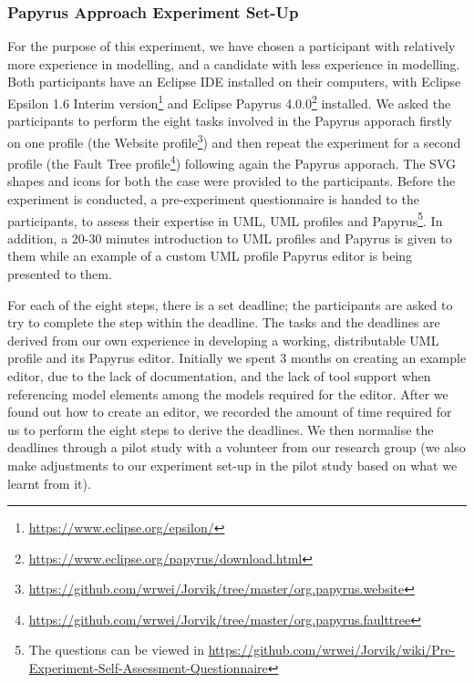 \subsubsection{Papyrus Approach Experiment Set-Up}
For the purpose of this experiment, we have chosen a participant with relatively more experience in modelling, and a candidate with less experience in modelling. 
Both participants have an Eclipse IDE installed on their computers, with Eclipse Epsilon 1.6 Interim version\footnote{\url{https://www.eclipse.org/epsilon/}} and Eclipse Papyrus 4.0.0\footnote{\url{https://www.eclipse.org/papyrus/download.html}} installed.
We asked the participants to perform the eight tasks involved in the Papyrus apporach firstly on one profile (the Website profile\footnote{\url{https://github.com/wrwei/Jorvik/tree/master/org.papyrus.website}}) and then repeat the experiment for a second profile (the Fault Tree profile\footnote{\url{https://github.com/wrwei/Jorvik/tree/master/org.papyrus.faulttree}}) following again the Papyrus apporach. 
The SVG shapes and icons for both the case were provided to the participants. 
Before the experiment is conducted, a pre-experiment questionnaire is handed to the participants, to assess their expertise in UML, UML profiles and Papyrus\footnote{The questions can be viewed in \url{https://github.com/wrwei/Jorvik/wiki/Pre-Experiment-Self-Assessment-Questionnaire}}. 
In addition, a 20-30 minutes introduction to UML profiles and Papyrus is given to them while an example of a custom UML profile Papyrus editor is being presented to them. 

For each of the eight steps, there is a set deadline; the participants are asked to try to complete the step within the deadline.
The tasks and the deadlines are derived from our own experience in developing a working, distributable UML profile and its Papyrus editor. 
Initially we spent 3 months on creating an example editor, due to the lack of documentation, and the lack of tool support when referencing model elements among the models required for the editor.
After we found out how to create an editor, we recorded the amount of time required for us to perform the eight steps to derive the deadlines. 
We then normalise the deadlines through a pilot study with a volunteer from our research group (we also make adjustments to our experiment set-up in the pilot study based on what we learnt from it). 

